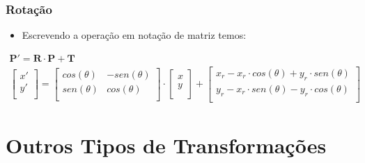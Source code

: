 \documentclass{beamer}
\begin{document}

\begin{frame}
\frametitle{Rotação}
		\begin{itemize}
			\item Escrevendo a operação em notação de matriz temos:
		\end{itemize}
		\begin{eqnarray*}
			\textbf{P}' = \textbf{R} \cdot \textbf{P} + \textbf{T} \\
			\begin{bmatrix} 
								x' \\
								y' \\
							\end{bmatrix}
			=
			 \begin{bmatrix}
								cos(\theta) & -sen(\theta) \\
								sen(\theta) & cos(\theta)\\
							\end{bmatrix}
			\cdot \begin{bmatrix}
								x \\
								y \\
							\end{bmatrix}
		 	+ \begin{bmatrix}
		 		x_r-x_r \cdot cos(\theta)+y_r \cdot sen(\theta) \\
				y_r-x_r \cdot sen(\theta)-y_r \cdot cos(\theta) \\		 	
		 	\end{bmatrix}
		\end{eqnarray*}
	
\end{frame}

\section{Outros Tipos de Transformações}
\end{document}
